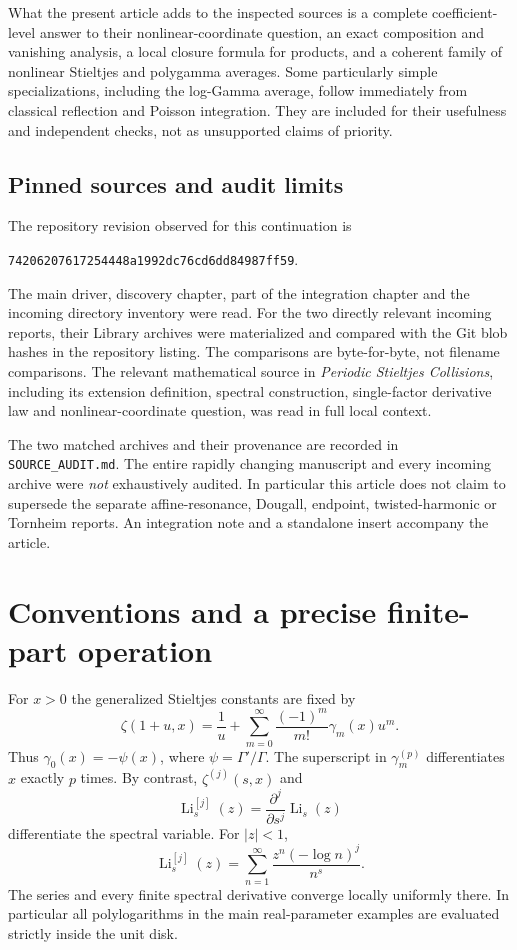 \documentclass[11pt]{article}
\theoremstyle{definition}\newtheorem{definition}[theorem]{Definition}
\theoremstyle{remark}\newtheorem{remark}[theorem]{Remark}
\DeclareMathOperator{\Li}{Li}
\newcommand{\LiJ}[2]{\Li_{#1}^{[#2]}}
\newcommand{\pin}{\texttt{74206207617254448a1992dc76cd6dd84987ff59}}
\begin{document}
What the present article adds to the inspected sources is a complete coefficient-level answer to their nonlinear-coordinate question, an exact composition and vanishing analysis, a local closure formula for products, and a coherent family of nonlinear Stieltjes and polygamma averages. Some particularly simple specializations, including the log-Gamma average, follow immediately from classical reflection and Poisson integration. They are included for their usefulness and independent checks, not as unsupported claims of priority.

\subsection{Pinned sources and audit limits}
The repository revision observed for this continuation is
\begin{center}\small\pin.\end{center}
The main driver, discovery chapter, part of the integration chapter and the incoming directory inventory were read. For the two directly relevant incoming reports, their Library archives were materialized and compared with the Git blob hashes in the repository listing. The comparisons are byte-for-byte, not filename comparisons. The relevant mathematical source in \emph{Periodic Stieltjes Collisions}, including its extension definition, spectral construction, single-factor derivative law and nonlinear-coordinate question, was read in full local context.

The two matched archives and their provenance are recorded in \texttt{SOURCE\_AUDIT.md}. The entire rapidly changing manuscript and every incoming archive were \emph{not} exhaustively audited. In particular this article does not claim to supersede the separate affine-resonance, Dougall, endpoint, twisted-harmonic or Tornheim reports. An integration note and a standalone insert accompany the article.

\section{Conventions and a precise finite-part operation}
\label{sec:conventions}
For $x>0$ the generalized Stieltjes constants are fixed by
\begin{equation}\label{eq:stieltjes-convention}
\zeta(1+u,x)=\frac1u+\sum_{m=0}^{\infty}\frac{(-1)^m}{m!}\gamma_m(x)u^m.
\end{equation}
Thus $\gamma_0(x)=-\psi(x)$, where $\psi=\Gamma'/\Gamma$.
The superscript in $\gamma_m^{(p)}$ differentiates $x$ exactly $p$ times. By contrast, $\zeta^{(j)}(s,x)$ and
\begin{equation}\label{eq:Li-jet}
\LiJ{s}{j}(z)=\frac{\partial^j}{\partial s^j}\Li_s(z)
\end{equation}
differentiate the spectral variable. For $|z|<1$,
\begin{equation}\label{eq:Li-series}
\LiJ{s}{j}(z)=\sum_{n=1}^{\infty}\frac{z^n(-\log n)^j}{n^s}.
\end{equation}
The series and every finite spectral derivative converge locally uniformly there. In particular all polylogarithms in the main real-parameter examples are evaluated strictly inside the unit disk.
\end{document}
